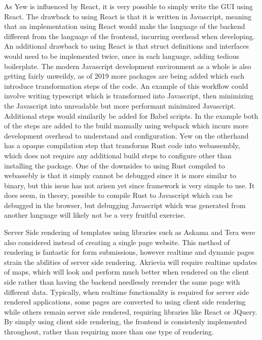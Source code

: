\bigskip
As Yew is influenced by React, it is very possible to simply write the GUI using React.
The drawback to using React is that it is written in Javascript, meaning that an implementation using React would make the language of the backend different from the language of the frontend, incurring overhead when developing.
An additional drawback to using React is that struct definitions and interfaces would need to be implemented twice, once in each language, adding tedious boilerplate.
The modern Javascript development environment as a whole is also getting fairly unweildy, as of 2019 more packages are being added which each introduce transformation steps of the code.
An example of this workflow could involve writing typescript which is transformed into Javascript, then minimizing the Javascript into unreadable but more performant minimized Javascript.
Additional steps would similarily be added for \Gls{Babel} scripts.
In the example both of the steps are added to the build manually using webpack which incurs more development overhead to understand and configuration.
Yew on the otherhand has a opaque compilation step that transforms Rust code into webassembly, which does not require any additional build steps to configure other than installing the package.
One of the downsides to using Rust compiled to webassebly is that it simply cannot be debugged since it is more similar to binary, but this issue has not arisen yet since framework is very simple to use.
It does seem, in theory, possible to compile Rust to Javascript which can be debugged in the browser, but debugging Javascript which was generated from another language will likely not be a very fruitful exercise.

\pagebreak
Server Side rendering of templates using libraries such as Askama and Tera were also considered instead of creating a single page website.
This method of rendering is fantastic for form submissions, however realtime and dynamic pages strain the abilities of server side rendering.
Akrievia will require realtime updates of maps, which will look and perform much better when rendered on the client side rather than having the backend needlessly rerender the same page with different data.
Typically, when realtime functionality is required for server side rendered applications, some pages are converted to using client side rendering while others remain server side rendered, requiring libraries like React or \Gls{JQuery}.
By simply using client side rendering, the frontend is consistenly implemented throughout, rather than requiring more than one type of rendering.

